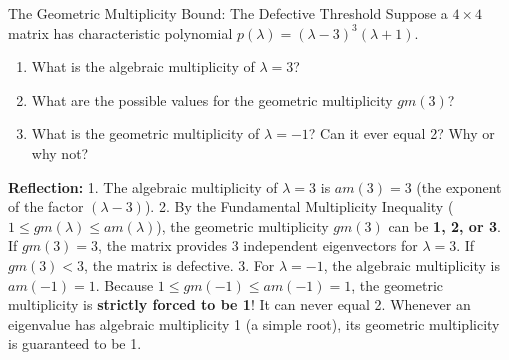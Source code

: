\begin{ponderbox}{The Geometric Multiplicity Bound: The Defective Threshold}
Suppose a $4 \times 4$ matrix has characteristic polynomial $p(\lambda) = (\lambda - 3)^3 (\lambda + 1)$.
\begin{enumerate}
    \item What is the algebraic multiplicity of $\lambda = 3$?
    \item What are the possible values for the geometric multiplicity $gm(3)$?
    \item What is the geometric multiplicity of $\lambda = -1$? Can it ever equal 2? Why or why not?
\end{enumerate}
\tcblower
\textbf{Reflection:}
1. The algebraic multiplicity of $\lambda = 3$ is $am(3) = 3$ (the exponent of the factor $(\lambda - 3)$).
2. By the Fundamental Multiplicity Inequality ($1 \le gm(\lambda) \le am(\lambda)$), the geometric multiplicity $gm(3)$ can be \textbf{1, 2, or 3}. If $gm(3) = 3$, the matrix provides 3 independent eigenvectors for $\lambda = 3$. If $gm(3) < 3$, the matrix is defective.
3. For $\lambda = -1$, the algebraic multiplicity is $am(-1) = 1$. Because $1 \le gm(-1) \le am(-1) = 1$, the geometric multiplicity is \textbf{strictly forced to be 1}! It can never equal 2. Whenever an eigenvalue has algebraic multiplicity 1 (a simple root), its geometric multiplicity is guaranteed to be 1.
\end{ponderbox}

